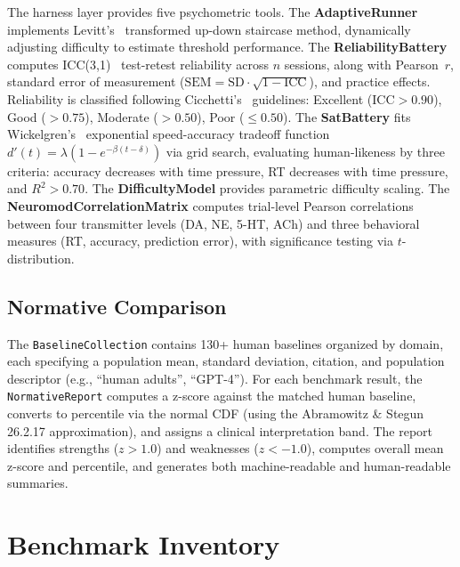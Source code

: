 \documentclass[11pt,letterpaper]{article}
\begin{document}
The harness layer provides five psychometric tools. The \textbf{AdaptiveRunner} implements Levitt's~\citep{levitt1971transformed} transformed up-down staircase method, dynamically adjusting difficulty to estimate threshold performance. The \textbf{ReliabilityBattery} computes ICC(3,1)~\citep{shrout1979intraclass} test-retest reliability across $n$ sessions, along with Pearson~$r$, standard error of measurement ($\mathrm{SEM} = \mathrm{SD} \cdot \sqrt{1 - \mathrm{ICC}}$), and practice effects. Reliability is classified following Cicchetti's~\citep{cicchetti1994guidelines} guidelines: Excellent ($\mathrm{ICC} > 0.90$), Good ($> 0.75$), Moderate ($> 0.50$), Poor ($\leq 0.50$). The \textbf{SatBattery} fits Wickelgren's~\citep{wickelgren1977speed} exponential speed-accuracy tradeoff function $d'(t) = \lambda(1 - e^{-\beta(t - \delta)})$ via grid search, evaluating human-likeness by three criteria: accuracy decreases with time pressure, RT decreases with time pressure, and $R^2 > 0.70$. The \textbf{DifficultyModel} provides parametric difficulty scaling. The \textbf{NeuromodCorrelationMatrix} computes trial-level Pearson correlations between four transmitter levels (DA, NE, 5-HT, ACh) and three behavioral measures (RT, accuracy, prediction error), with significance testing via $t$-distribution.

\subsection{Normative Comparison}

The \texttt{BaselineCollection} contains 130+ human baselines organized by domain, each specifying a population mean, standard deviation, citation, and population descriptor (e.g., ``human adults'', ``GPT-4''). For each benchmark result, the \texttt{NormativeReport} computes a z-score against the matched human baseline, converts to percentile via the normal CDF (using the Abramowitz \& Stegun 26.2.17 approximation), and assigns a clinical interpretation band. The report identifies strengths ($z > 1.0$) and weaknesses ($z < -1.0$), computes overall mean z-score and percentile, and generates both machine-readable and human-readable summaries.

\section{Benchmark Inventory}
\label{sec:inventory}
\end{document}
